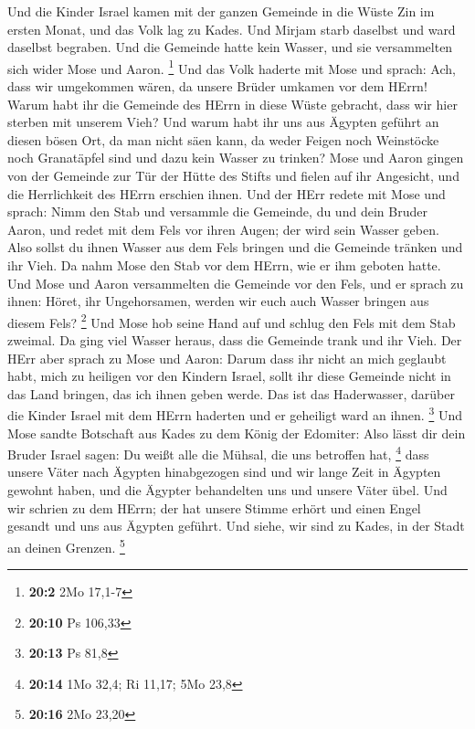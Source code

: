  Und die Kinder Israel kamen mit der ganzen Gemeinde in
die Wüste Zin im ersten Monat, und das Volk lag zu Kades. Und Mirjam
starb daselbst und ward daselbst begraben.  Und die
Gemeinde hatte kein Wasser, und sie versammelten sich wider Mose und
Aaron. \footnote{\textbf{20:2} 2Mo 17,1-7}  Und das Volk
haderte mit Mose und sprach: Ach, dass wir umgekommen wären, da unsere
Brüder umkamen vor dem HErrn!  Warum habt ihr die Gemeinde
des HErrn in diese Wüste gebracht, dass wir hier sterben mit unserem
Vieh?  Und warum habt ihr uns aus Ägypten geführt an
diesen bösen Ort, da man nicht säen kann, da weder Feigen noch
Weinstöcke noch Granatäpfel sind und dazu kein Wasser zu trinken?
 Mose und Aaron gingen von der Gemeinde zur Tür der Hütte
des Stifts und fielen auf ihr Angesicht, und die Herrlichkeit des HErrn
erschien ihnen.  Und der HErr redete mit Mose und sprach:
 Nimm den Stab und versammle die Gemeinde, du und dein
Bruder Aaron, und redet mit dem Fels vor ihren Augen; der wird sein
Wasser geben. Also sollst du ihnen Wasser aus dem Fels bringen und die
Gemeinde tränken und ihr Vieh.  Da nahm Mose den Stab vor
dem HErrn, wie er ihm geboten hatte.  Und Mose und Aaron
versammelten die Gemeinde vor den Fels, und er sprach zu ihnen: Höret,
ihr Ungehorsamen, werden wir euch auch Wasser bringen aus diesem Fels?
\footnote{\textbf{20:10} Ps 106,33}  Und Mose hob seine
Hand auf und schlug den Fels mit dem Stab zweimal. Da ging viel Wasser
heraus, dass die Gemeinde trank und ihr Vieh.  Der HErr
aber sprach zu Mose und Aaron: Darum dass ihr nicht an mich geglaubt
habt, mich zu heiligen vor den Kindern Israel, sollt ihr diese Gemeinde
nicht in das Land bringen, das ich ihnen geben werde. 
Das ist das Haderwasser, darüber die Kinder Israel mit dem HErrn
haderten und er geheiligt ward an ihnen. \footnote{\textbf{20:13} Ps
  81,8}  Und Mose sandte Botschaft aus Kades zu dem König
der Edomiter: Also lässt dir dein Bruder Israel sagen: Du weißt alle die
Mühsal, die uns betroffen hat, \footnote{\textbf{20:14} 1Mo 32,4; Ri
  11,17; 5Mo 23,8}  dass unsere Väter nach Ägypten
hinabgezogen sind und wir lange Zeit in Ägypten gewohnt haben, und die
Ägypter behandelten uns und unsere Väter übel.  Und wir
schrien zu dem HErrn; der hat unsere Stimme erhört und einen Engel
gesandt und uns aus Ägypten geführt. Und siehe, wir sind zu Kades, in
der Stadt an deinen Grenzen. \footnote{\textbf{20:16} 2Mo 23,20}
